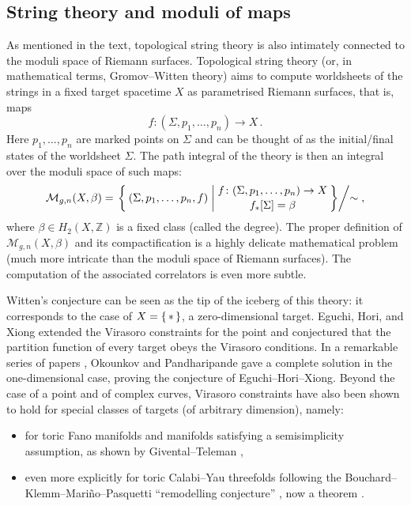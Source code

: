 \documentclass[11pt,reqno]{amsart}
\numberwithin{equation}{section}
\newcommand{\mb}[1]{\mathbb{#1}}
\newcommand{\mc}[1]{\mathcal{#1}}
\newcommand{\Z}{\mb{Z}}
\newcommand{\M}{\mc{M}}
\theoremstyle{plain}
\theoremstyle{definition}
\begin{document}
\subsection{String theory and moduli of maps}
As mentioned in the text, topological string theory is also intimately connected to the moduli space of Riemann surfaces. Topological string theory (or, in mathematical terms, Gromov--Witten theory) aims to compute worldsheets of the strings in a fixed target spacetime $X$ as parametrised Riemann surfaces, that is, maps
\begin{equation}
  f \colon (\Sigma,p_1,\ldots,p_n) \longrightarrow X \,.
\end{equation}
Here $p_1,\ldots,p_n$ are marked points on $\Sigma$ and can be thought of as the initial/final states of the worldsheet $\Sigma$. The path integral of the theory is then an integral over the moduli space of such maps:
\begin{equation}
  \M_{g,n}(X,\beta) = \left. \Set{
    (\Sigma,p_1,\dots,p_n,f) | \substack{
      \displaystyle f \colon (\Sigma,p_1,\ldots,p_n) \to X  \\[.5ex]
      \displaystyle \text{$f_{\ast}[\Sigma] = \beta$}
      }
    }
    \middle/ \sim \right. ,\\[1ex]
\end{equation}
where $\beta \in H_2(X,\Z)$ is a fixed class (called the degree). The proper definition of $\M_{g,n}(X,\beta)$ and its compactification is a highly delicate mathematical problem (much more intricate than the moduli space of Riemann surfaces). The computation of the associated correlators is even more subtle.

Witten's conjecture can be seen as the tip of the iceberg of this theory: it corresponds to the case of $X = \set{*}$, a zero-dimensional target. Eguchi, Hori, and Xiong \cite{EHX97} extended the Virasoro constraints for the point and conjectured that the partition function of every target obeys the Virasoro conditions. In a remarkable series of papers \cite{OP06a,OP06b,OP06c}, Okounkov and Pandharipande gave a complete solution in the one-dimensional case, proving the conjecture of Eguchi--Hori--Xiong.
Beyond the case of a point and of complex curves, Virasoro constraints have also been shown to hold for special classes of targets (of arbitrary dimension), namely:
\begin{itemize}
  \item for toric Fano manifolds and manifolds satisfying a semisimplicity assumption, as shown by Givental--Teleman \cite{Giv01a,Tel12},

  \item even more explicitly for toric Calabi--Yau threefolds following the Bouchard--Klemm--Mariño--Pasquetti ``remodelling conjecture'' \cite{BKMP09}, now a theorem \cite{EO15,FLZ20}.
\end{itemize}

\newpage
\printbibliography
\end{document}
